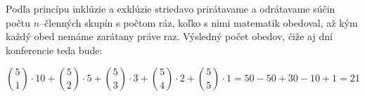 
Podľa princípu inklúzie a exklúzie striedavo prirátavame a odrátavame 
súčin počtu $n$--členných skupín s počtom ráz, koľko s nimi matematik 
obedoval, až kým každý obed nemáme zarátany práve raz. Výsledný počet 
obedov, čiže aj dní konferencie teda bude:

\[\binom{5}{1} \cdot 10 + \binom{5}{2} \cdot 5 + \binom{5}{3} \cdot 
3 + \binom{5}{4} \cdot 2 + \binom{5}{5} \cdot 1 = 50-50+30-10+1 = 21\]

